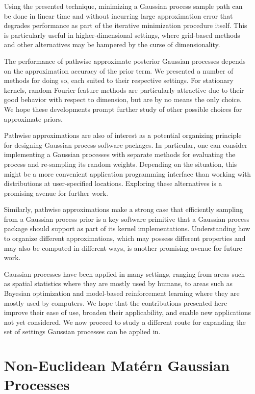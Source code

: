 \documentclass[11pt]{book}
\begin{document}
Using the presented technique, minimizing a Gaussian process sample path can be done in linear time and without incurring large approximation error that degrades performance as part of the iterative minimization procedure itself.
This is particularly useful in higher-dimensional settings, where grid-based methods and other alternatives may be hampered by the curse of dimensionality.

The performance of pathwise approximate posterior Gaussian processes depends on the approximation accuracy of the prior term.
We presented a number of methods for doing so, each suited to their respective settings.
For stationary kernels, random Fourier feature methods are particularly attractive due to their good behavior with respect to dimension, but are by no means the only choice.
We hope these developments prompt further study of other possible choices for approximate priors.

Pathwise approximations are also of interest as a potential organizing principle for designing Gaussian process software packages.
In particular, one can consider implementing a Gaussian processes with separate methods for evaluating the process and re-sampling its random weights.
Depending on the situation, this might be a more convenient application programming interface than working with distributions at user-specified locations.
Exploring these alternatives is a promising avenue for further work.

Similarly, pathwise approximations make a strong case that efficiently sampling from a Gaussian process prior is a key software primitive that a Gaussian process package should support as part of its kernel implementations. 
Understanding how to organize different approximations, which may possess different properties and may also be computed in different ways, is another promising avenue for future work.

Gaussian processes have been applied in many settings, ranging from areas such as spatial statistics where they are mostly used by humans, to areas such as Bayesian optimization and model-based reinforcement learning where they are mostly used by computers.
We hope that the contributions presented here improve their ease of use, broaden their applicability, and enable new applications not yet considered.
We now proceed to study a different route for expanding the set of settings Gaussian processes can be applied in.





\chapter{Non-Euclidean Matérn Gaussian Processes}
\label{ch:noneuclidean}
\end{document}
